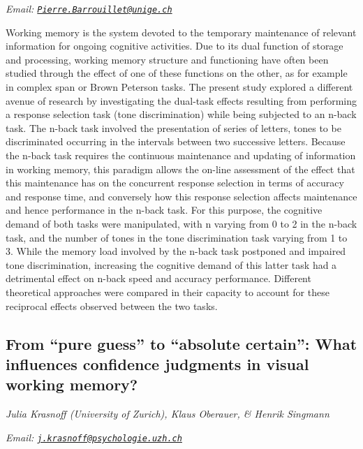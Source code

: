 \documentclass[12pt,]{book}
\begin{document}
\emph{Email: \href{mailto:Pierre.Barrouillet@unige.ch}{\nolinkurl{Pierre.Barrouillet@unige.ch}}}

Working memory is the system devoted to the temporary maintenance of relevant information for ongoing cognitive activities. Due to its dual function of storage and processing, working memory structure and functioning have often been studied through the effect of one of these functions on the other, as for example in complex span or Brown Peterson tasks. The present study explored a different avenue of research by investigating the dual-task effects resulting from performing a response selection task (tone discrimination) while being subjected to an n-back task. The n-back task involved the presentation of series of letters, tones to be discriminated occurring in the intervals between two successive letters. Because the n-back task requires the continuous maintenance and updating of information in working memory, this paradigm allows the on-line assessment of the effect that this maintenance has on the concurrent response selection in terms of accuracy and response time, and conversely how this response selection affects maintenance and hence performance in the n-back task. For this purpose, the cognitive demand of both tasks were manipulated, with n varying from 0 to 2 in the n-back task, and the number of tones in the tone discrimination task varying from 1 to 3. While the memory load involved by the n-back task postponed and impaired tone discrimination, increasing the cognitive demand of this latter task had a detrimental effect on n-back speed and accuracy performance. Different theoretical approaches were compared in their capacity to account for these reciprocal effects observed between the two tasks.

\hypertarget{from-pure-guess-to-absolute-certain-what-influences-confidence-judgments-in-visual-working-memory}{%
\subsection{From ``pure guess'' to ``absolute certain'': What influences confidence judgments in visual working memory?}\label{from-pure-guess-to-absolute-certain-what-influences-confidence-judgments-in-visual-working-memory}}

\emph{Julia Krasnoff (University of Zurich), Klaus Oberauer, \& Henrik Singmann}

\emph{Email: \href{mailto:j.krasnoff@psychologie.uzh.ch}{\nolinkurl{j.krasnoff@psychologie.uzh.ch}}}
\end{document}
